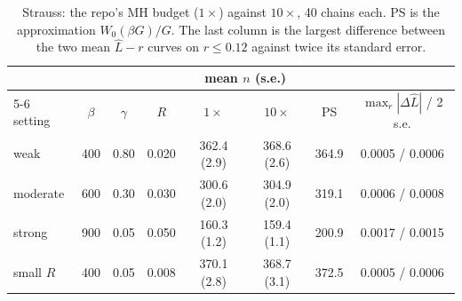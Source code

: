 \documentclass[10pt,a4paper]{article}
\begin{document}
\begin{table}[ht]
\centering\small
\begin{tabular}{@{}l ccc cc c c@{}}
\toprule
 & & & & \multicolumn{2}{c}{mean $n$ (s.e.)} & & \\
\cmidrule(lr){5-6}
setting & $\beta$ & $\gamma$ & $R$ & $1\times$ & $10\times$ & PS & $\max_r|\Delta\hat L|$ / 2 s.e.\\
\midrule
weak     & 400 & 0.80 & 0.020 & 362.4 (2.9) & 368.6 (2.6) & 364.9 & 0.0005 / 0.0006\\
moderate & 600 & 0.30 & 0.030 & 300.6 (2.0) & 304.9 (2.0) & 319.1 & 0.0006 / 0.0008\\
strong   & 900 & 0.05 & 0.050 & 160.3 (1.2) & 159.4 (1.1) & 200.9 & 0.0017 / 0.0015\\
small $R$& 400 & 0.05 & 0.008 & 370.1 (2.8) & 368.7 (3.1) & 372.5 & 0.0005 / 0.0006\\
\bottomrule
\end{tabular}
\caption{Strauss: the repo's MH budget ($1\times$) against $10\times$, 40 chains each. PS is the approximation $W_0(\beta G)/G$. The last column is the largest difference between the two mean $\hat L-r$ curves on $r\le0.12$ against twice its standard error.}
\label{tab:strauss}
\end{table}
\end{document}
